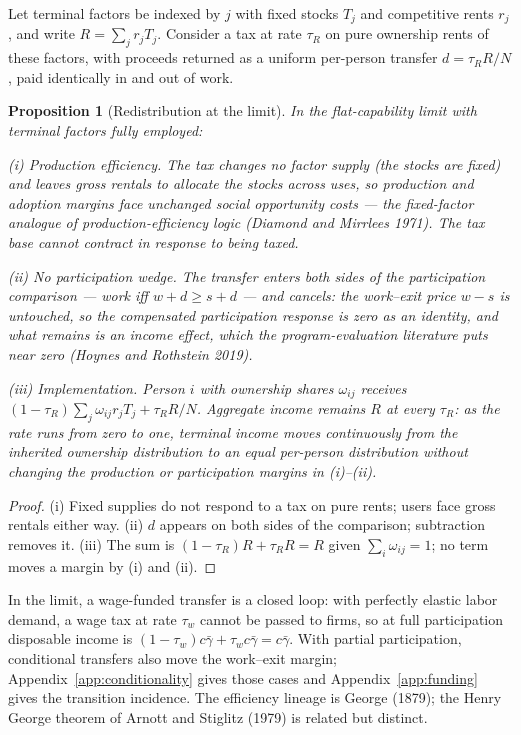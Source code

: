 \documentclass[12pt]{article}
\theoremstyle{plain}
\newtheorem{proposition}{Proposition}
\begin{document}
Let terminal factors be indexed by $j$ with fixed stocks $T_j$ and competitive rents $r_j$, and write $R = \sum _j r_j T_j$. Consider a tax at rate $\tau _R$ on pure ownership rents of these factors, with proceeds returned as a uniform per-person transfer $d = \tau _R R/N$, paid identically in and out of work.

\begin{proposition}[Redistribution at the limit]\label{prop:welfare}
In the flat-capability limit with terminal factors fully employed:

(i) \emph{Production efficiency.} The tax changes no factor supply (the stocks are fixed) and leaves gross rentals to allocate the stocks across uses, so production and adoption margins face unchanged social opportunity costs --- the fixed-factor analogue of production-efficiency logic (Diamond and Mirrlees 1971). The tax base cannot contract in response to being taxed.

(ii) \emph{No participation wedge.} The transfer enters both sides of the participation comparison --- work iff $w + d \ge s + d$ --- and cancels: the work--exit price $w - s$ is untouched, so the compensated participation response is zero as an identity, and what remains is an income effect, which the program-evaluation literature puts near zero (Hoynes and Rothstein 2019).

(iii) \emph{Implementation.} Person $i$ with ownership shares $\omega _{ij}$ receives $(1-\tau _R)\sum _j\omega _{ij}r_jT_j+\tau _RR/N$. Aggregate income remains $R$ at every $\tau _R$: as the rate runs from zero to one, terminal income moves continuously from the inherited ownership distribution to an equal per-person distribution without changing the production or participation margins in (i)--(ii).
\end{proposition}

\begin{proof}
(i) Fixed supplies do not respond to a tax on pure rents; users face gross rentals either way. (ii) $d$ appears on both sides of the comparison; subtraction removes it. (iii) The sum is $(1-\tau _R)R + \tau _R R = R$ given $\sum _i\omega _{ij} = 1$; no term moves a margin by (i) and (ii).
\end{proof}

In the limit, a wage-funded transfer is a closed loop: with perfectly elastic labor demand, a wage tax at rate $\tau_w$ cannot be passed to firms, so at full participation disposable income is $(1-\tau_w)c\bar{\gamma}+\tau_wc\bar{\gamma}=c\bar{\gamma}$. With partial participation, conditional transfers also move the work--exit margin; Appendix~\ref{app:conditionality} gives those cases and Appendix~\ref{app:funding} gives the transition incidence. The efficiency lineage is George (1879); the Henry George theorem of Arnott and Stiglitz (1979) is related but distinct.
\end{document}
